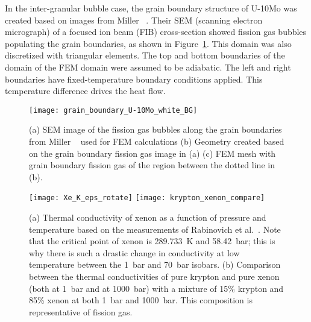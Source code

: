 In the inter-granular bubble case, the grain boundary structure of U-10Mo was created based on images from Miller \etal~\cite{miller2012advantages}. Their SEM (scanning electron micrograph) of a focused ion beam (FIB) cross-section showed fission gas bubbles populating the grain boundaries, as shown in Figure~\ref{fig_Xe_SEM}. This domain was also discretized with triangular elements. The top and bottom boundaries of the domain of the FEM domain were assumed to be adiabatic. The left and right boundaries have fixed-temperature boundary conditions applied. This temperature difference drives the heat flow. 


\begin{figure}%
\centering
\texttt{[image: grain\_boundary\_U-10Mo\_white\_BG]}
\caption[(a) SEM image of the fission gas bubbles along the grain boundaries from Miller used for FEM calculations (b) Geometry created based on the grain boundary fission gas image in (a) (c) FEM mesh with grain boundary fission gas of the region between the dotted line in  (b).]{(a) SEM image of the fission gas bubbles along the grain boundaries from Miller \etal~\cite{miller2012advantages} used for FEM calculations (b) Geometry created based on the grain boundary fission gas image in (a) (c) FEM mesh with grain boundary fission gas of the region between the dotted line in  (b). }
\label{fig_Xe_SEM}
\end{figure}
\begin{figure}
\centering
\texttt{[image: Xe\_K\_eps\_rotate]}
\texttt{[image: krypton\_xenon\_compare]}
\caption[(a) Thermal conductivity of xenon as a function of pressure and
temperature based on the measurements of Rabinovich et
al.]{(a) Thermal conductivity of xenon as a function of pressure and
temperature based on the measurements of Rabinovich et
al.~\cite{rabinovich1987thermophysical}.  Note that the critical point of xenon
is 289.733~K and 58.42~bar; this is why there is such a drastic change in
conductivity at low temperature between the 1~bar and 70~bar isobars.
{(b) Comparison between the thermal conductivities of pure
krypton and pure xenon (both at 1~bar and at 1000~bar) with a mixture of
15\% krypton and 85\% xenon at both 1~bar and 1000~bar. This composition is
representative of fission gas.}}
\label{fig_Xe_pressure}
\end{figure}

